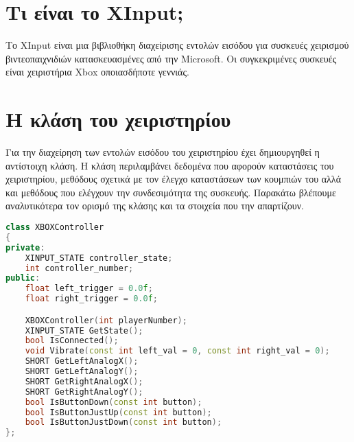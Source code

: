 



\section{Τι είναι το XInput;}
Το XInput είναι μια βιβλιοθήκη διαχείρισης εντολών εισόδου για
συσκευές χειρισμού βιντεοπαιχνιδιών κατασκευασμένες από την Microsoft.
Οι συγκεκριμένες συσκευές είναι χειριστήρια Xbox οποιασδήποτε γεννιάς.

\section{Η κλάση του χειριστηρίου}

Για την διαχείρηση των εντολών εισόδου του χειριστηρίου έχει δημιουργηθεί
η αντίστοιχη κλάση. Η κλάση περιλαμβάνει δεδομένα που αφορούν καταστάσεις
του χειριστηρίου, μεθόδους σχετικά με τον έλεγχο καταστάσεων των κουμπιών
του αλλά και μεθόδους που ελέγχουν την συνδεσιμότητα της συσκευής. Παρακάτω
βλέπουμε αναλυτικότερα τον ορισμό της κλάσης και τα στοιχεία που την απαρτίζουν.

\begin{lstlisting}[language=C++, style=cppstyle]
class XBOXController
{
private:
    XINPUT_STATE controller_state;
    int controller_number;
public:
    float left_trigger = 0.0f;
    float right_trigger = 0.0f;

    XBOXController(int playerNumber);
    XINPUT_STATE GetState();
    bool IsConnected();
    void Vibrate(const int left_val = 0, const int right_val = 0);
    SHORT GetLeftAnalogX();
    SHORT GetLeftAnalogY();
    SHORT GetRightAnalogX();
    SHORT GetRightAnalogY();
    bool IsButtonDown(const int button);
    bool IsButtonJustUp(const int button);
    bool IsButtonJustDown(const int button);
};
\end{lstlisting}





\begin{lstlisting}[language=C++, style=cppstyle]
\end{lstlisting}